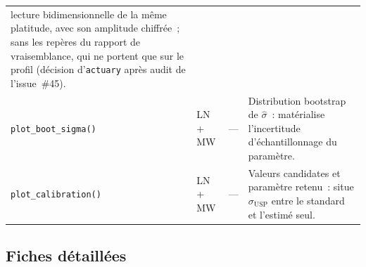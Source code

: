 \documentclass[a4paper,11pt]{article}
\newcommand{\code}[1]{\texttt{\small #1}}
\begin{document}
\begin{center}
\begin{tabular}{@{}p{4.7cm}p{1.3cm}p{1.9cm}p{6.3cm}@{}}
lecture bidimensionnelle de la même platitude, avec son amplitude chiffrée~; sans les repères
du rapport de vraisemblance, qui ne portent que sur le profil (décision d'\code{actuary} après
audit de l'issue~\#45). \\
\code{plot\_boot\_sigma()} & LN + MW & --- & Distribution bootstrap de
$\hat\sigma$~: matérialise l'incertitude d'échantillonnage du paramètre. \\
\code{plot\_calibration()} & LN + MW & --- & Valeurs candidates et paramètre
retenu~: situe $\sigma_{\mathrm{USP}}$ entre le standard et l'estimé seul. \\
\end{tabular}
\end{center}

\subsection{Fiches détaillées}
\end{document}
